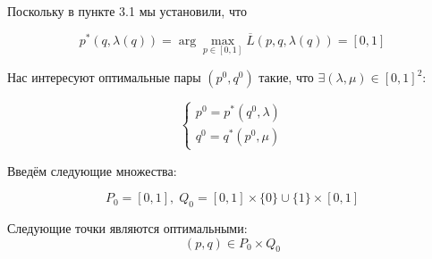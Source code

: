 	Поскольку в пункте 3.1 мы установили, что 
	
	$$p^*(q,\lambda(q))=\arg \max \limits_{p \in [0,1]}
		\overline{L}(p, q, \lambda(q))=[0,1]
	$$

	Нас интересуют оптимальные пары $(p^0,q^0)$ такие, что 
	$\exists (\lambda, \mu) \in [0,1]^2 $:
	
	$$\begin{cases}
	p^0=p^*(q^0,\lambda) \\
	q^0=q^*(p^0,\mu)
	\end{cases}$$
	
	Введём следующие множества:
	
	$$P_0=[0,1], \; Q_0=[0,1] \times \{0\} \cup \{1\} \times [0,1]$$
	
	Следующие точки являются оптимальными:
	$$(p, q) \in P_0 \times Q_0$$













